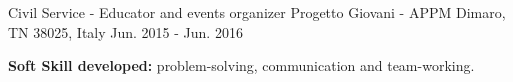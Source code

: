 \begin{cventries}
  \cventry
    {Civil Service - Educator and events organizer} %
    {Progetto Giovani - APPM} %
    {Dimaro, TN 38025, Italy} %
    {Jun. 2015 - Jun. 2016} %
    {
      \begin{cvitems} %
        \item {\textbf{Soft Skill developed:} problem-solving, communication and team-working.}
      \end{cvitems}
    }

\end{cventries}
